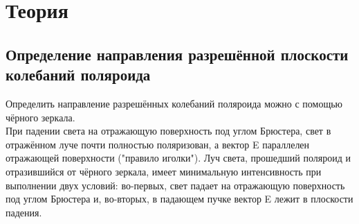 

\newcommand{\formula}[2]
{
    \begin{equation}\label{#1}
        #2
    \end{equation}
}

\newcommand{\mth}[1]
{
    \begin{math}
        #1
    \end{math}
}

\newcommand{\ruB}[1]
{
    _{\text{#1}}
}

\setcounter{PicsCounter}{1}

\newcommand{\pic}[3]{
    \begin{center}
    \begin{minipage}[h!]{#1}
    \begin{center}

    \texttt{[image: \#2]}
    \textit{Рис \arabic{PicsCounter}. #3}

    \end{center}
    \end{minipage}
    \end{center}

    \stepcounter{PicsCounter}
}

\setcounter{TablesCounter}{1}

\newcommand{\tableLable}[1]{
    \textit{Рис \arabic{TablesCounter}: #1}

    \stepcounter{TablesCounter}
}

\section{Теория}

\subsection{Определение направления разрешённой плоскости колебаний поляроида}

Определить направление разрешённых колебаний поляроида можно с помощью чёрного зеркала. \\

При падении света на отражающую поверхность под углом Брюстера, свет в отражённом луче
почти полностью поляризован, а вектор E параллелен отражающей поверхности ("правило иголки").
Луч света, прошедший поляроид и отразившийся от чёрного зеркала, имеет минимальную
интенсивность при выполнении двух условий: во-первых, свет падает на отражающую поверхность
под углом Брюстера и, во-вторых, в падающем пучке вектор E лежит в плоскости падения. \\

